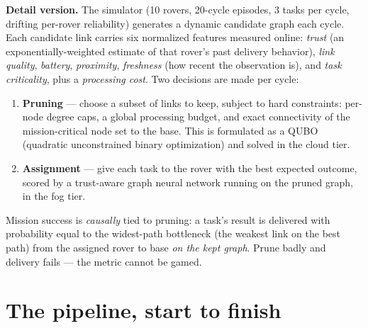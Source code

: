 \documentclass[11pt]{article}
\newenvironment{card}{%
  \def\FrameCommand{\fboxsep=8pt\fcolorbox{cardline}{cardbg}}%
  \MakeFramed{\advance\hsize-\width\FrameRestore}\noindent}{\endMakeFramed}
\begin{document}
\begin{card}
\textbf{Detail version.} The simulator (10 rovers, 20-cycle episodes,
3 tasks per cycle, drifting per-rover reliability) generates a dynamic
candidate graph each cycle. Each candidate link carries six normalized
features measured online: \emph{trust} (an exponentially-weighted estimate of
that rover's past delivery behavior), \emph{link quality}, \emph{battery},
\emph{proximity}, \emph{freshness} (how recent the observation is), and
\emph{task criticality}, plus a \emph{processing cost}. Two decisions are
made per cycle:

\begin{enumerate}
\item \textbf{Pruning} --- choose a subset of links to keep, subject to hard
constraints: per-node degree caps, a global processing budget, and exact
connectivity of the mission-critical node set to the base. This is
formulated as a QUBO (quadratic unconstrained binary optimization) and
solved in the cloud tier.
\item \textbf{Assignment} --- give each task to the rover with the best
expected outcome, scored by a trust-aware graph neural network running on
the pruned graph, in the fog tier.
\end{enumerate}

Mission success is \emph{causally} tied to pruning: a task's result is
delivered with probability equal to the widest-path bottleneck (the weakest
link on the best path) from the assigned rover to base \emph{on the kept
graph}. Prune badly and delivery fails --- the metric cannot be gamed.
\end{card}

\section{The pipeline, start to finish}
\end{document}
